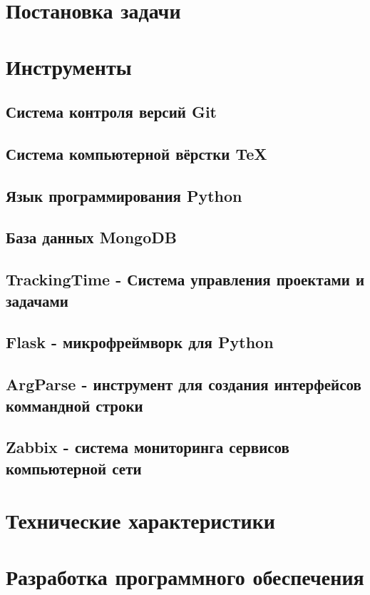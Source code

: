 \section{Постановка задачи}
\setcounter{figure}{0}

\section{Инструменты}
\setcounter{figure}{0}
\subsection{Система контроля версий Git}

\subsection{Система компьютерной вёрстки \TeX}

\subsection{Язык программирования Python}

\subsection{База данных MongoDB}

\subsection{TrackingTime - Система управления проектами и задачами}

\subsection{Flask - микрофреймворк для Python}

\subsection{ArgParse - инструмент для создания интерфейсов коммандной строки}

\subsection{Zabbix - система мониторинга сервисов компьютерной сети}


\newpage
\section{Технические характеристики}


\section{Разработка программного обеспечения}
\setcounter{figure}{0}
 
